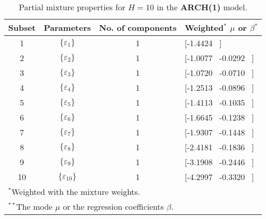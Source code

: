 \footnotesize{  
{ \renewcommand{\arraystretch}{1.3} 
\begin{longtable}{cccp{3.6cm}} 
\caption{Partial mixture properties for $H=10$ in the \textbf{ARCH(1)} model.} 
\label{tab:pmits_arch_ML} \\ 
 Subset & Parameters & No. of components  & Weighted$^{*}$ $\mu$ or $\beta$$^{*}$ \\ \hline 
1 & $\{\varepsilon_{1}\}$ & 1 & [-1.4424 \, ]   \\ [1ex] 
2 & $\{\varepsilon_{2}\}$ & 1 & [-1.0077 \, -0.0292 \, ]   \\ [1ex] 
3 & $\{\varepsilon_{3}\}$ & 1 & [-1.0720 \, -0.0710 \, ]   \\ [1ex] 
4 & $\{\varepsilon_{4}\}$ & 1 & [-1.2513 \, -0.0896 \, ]   \\ [1ex] 
5 & $\{\varepsilon_{5}\}$ & 1 & [-1.4113 \, -0.1035 \, ]   \\ [1ex] 
6 & $\{\varepsilon_{6}\}$ & 1 & [-1.6645 \, -0.1238 \, ]   \\ [1ex] 
7 & $\{\varepsilon_{7}\}$ & 1 & [-1.9307 \, -0.1448 \, ]   \\ [1ex] 
8 & $\{\varepsilon_{8}\}$ & 1 & [-2.4181 \, -0.1836 \, ]   \\ [1ex] 
9 & $\{\varepsilon_{9}\}$ & 1 & [-3.1908 \, -0.2446 \, ]   \\ [1ex] 
10 & $\{\varepsilon_{10}\}$ & 1 & [-4.2997 \, -0.3320 \, ]   \\ [1ex] 
\hline 
 \multicolumn{4}{l}{\footnotesize{$^{*}$Weighted with the mixture weights.}} \\ 
 \multicolumn{4}{l}{\footnotesize{$^{**}$The mode $\mu$ or the regression coefficients $\beta$.}} \\ 
\end{longtable} 
} 
} 
